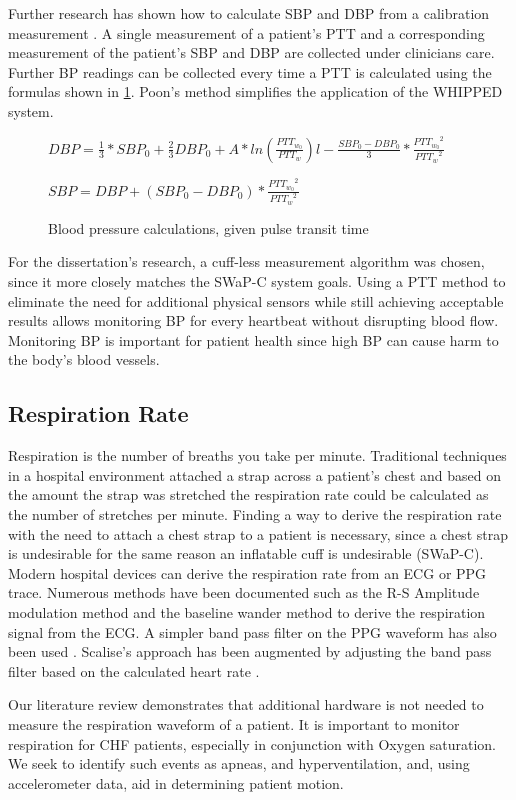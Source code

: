 Further research has shown how to calculate SBP and DBP from a calibration measurement \cite{Poon2005}. A single measurement of a patient's PTT and a corresponding measurement of the patient's SBP and DBP are collected under clinicians care. Further BP readings can be collected every time a PTT is calculated using the formulas shown in \cref{fig:BPCalc}.\cite{Poon2005} Poon's method simplifies the application of the WHIPPED system.

\begin{figure}
	\begin{center}

		\label{fig:BPCalc}
		
		$DBP=\frac{1}{3}*SBP_{0} + \frac{2}{3}DBP_{0} + A*ln(\frac{PTT_{w_{0}}}{PTT_{w}})l-\frac{SBP_{0} - DBP_{0}}{3}*\frac{{PTT_{w_{0}}}^{2}}{{PTT_{w}}^{2}}$
		
		$SBP=DBP+(SBP_{0}-DBP_{0})*\frac{{PTT_{w_{0}}}^2}{{PTT_{w}}^2}$
		\caption{Blood pressure calculations, given pulse transit time }
	\end{center}
\end{figure}

For the dissertation's research, a cuff-less measurement algorithm was chosen, since it more closely matches the SWaP-C system goals. Using a PTT method to eliminate the need for additional physical sensors while still achieving acceptable results allows monitoring BP for every heartbeat without disrupting blood flow. Monitoring BP is important for patient health since high BP can cause harm to the body's blood vessels.

\subsection{Respiration Rate}
\label{subsec:RespirationRate}

Respiration is the number of breaths you take per minute. Traditional techniques in a hospital environment attached a strap across a patient's chest and based on the amount the strap was stretched the respiration rate could be calculated as the number of stretches per minute. Finding a way to derive the respiration rate with the need to attach a chest strap to a patient is necessary, since a chest strap is undesirable for the same reason an inflatable cuff is undesirable (SWaP-C). Modern hospital devices can derive the respiration rate from an ECG or PPG trace. Numerous methods have been documented such as the R-S Amplitude modulation method \cite{Dziuda2011} \cite{Noor2011} and the baseline wander method \cite{Scully2012} \cite{Ponomarenko2005} to derive the respiration signal from the ECG. A simpler band pass filter on the PPG waveform has also been used \cite{Scalise2011}. Scalise's approach has been augmented by adjusting the band pass filter based on the calculated heart rate \cite{Mason2002}.

Our literature review demonstrates that additional hardware is not needed to measure the respiration waveform of a patient. It is important to monitor respiration for CHF patients, especially in conjunction with Oxygen saturation. We seek to identify such events as apneas, and hyperventilation, and, using accelerometer data, aid in determining patient motion.
